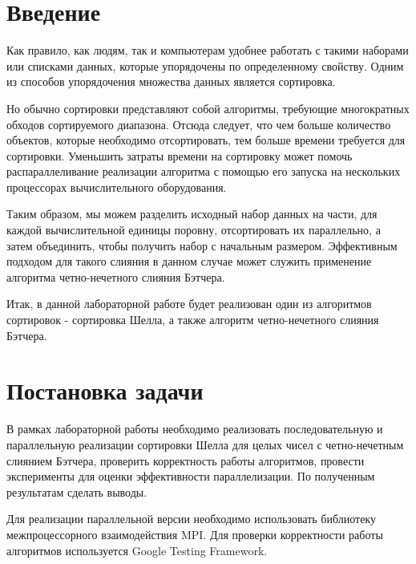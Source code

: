 \documentclass{report}
\begin{document}
\setcounter{page}{2}

\tableofcontents
\newpage

\section*{Введение}
Как правило, как людям, так и компьютерам удобнее работать с такими наборами или списками данных, которые упорядочены по определенному свойству. Одним из способов упорядочения множества данных является сортировка.
\par Но обычно сортировки представляют собой алгоритмы, требующие многократных обходов сортируемого диапазона. Отсюда следует, что чем больше количество объектов, которые необходимо отсортировать, тем больше времени требуется для сортировки. Уменьшить затраты времени на сортировку может помочь распараллеливание реализации алгоритма с помощью его запуска на нескольких процессорах вычислительного оборудования.
\par Таким образом, мы можем разделить исходный набор данных на части, для каждой вычислительной единицы поровну, отсортировать их параллельно, а затем объединить, чтобы получить набор с начальным размером. Эффективным подходом для такого слияния в данном случае может служить применение алгоритма четно-нечетного слияния Бэтчера.
\par Итак, в данной лабораторной работе будет реализован один из алгоритмов сортировок - сортировка Шелла, а также алгоритм четно-нечетного слияния Бэтчера.
\newpage

\section*{Постановка задачи}
В рамках лабораторной работы необходимо реализовать последовательную и параллельную реализации сортировки Шелла для целых чисел с четно-нечетным слиянием Бэтчера, проверить корректность работы алгоритмов, провести эксперименты для оценки эффективности параллелизации. По полученным результатам сделать выводы.
\par Для реализации параллельной версии необходимо использовать библиотеку межпроцессорного взаимодействия MPI. Для проверки корректности работы алгоритмов используется Google Testing Framework.
\newpage

\end{document}
